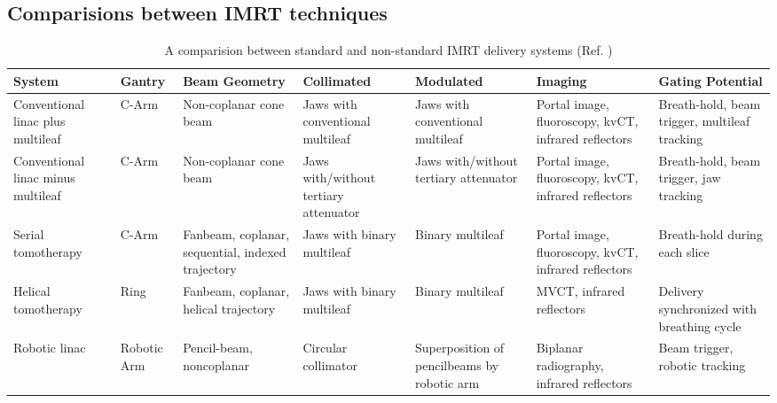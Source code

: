 \documentclass[10pt,journal,compsoc]{IEEEtran} %
\begin{document}
  \subsection{Comparisions between IMRT techniques}
  \label{comparisions}
    \begin{table}[htbp!]
      \centering
      \caption{A comparision between standard and non-standard IMRT delivery 
      systems (Ref. \cite{Fenwick2006})}
      \small{
      \begin{tabulary}{\linewidth}{LLLLLLL}
        \toprule[0.04cm]
        
        \textbf{System} & \textbf{Gantry} & \textbf{ Beam Geometry} & 
        \textbf{Collimated} & \textbf{Modulated} & \textbf{Imaging} & 
        \textbf{Gating
          Potential} \\\toprule[0.04cm]
        
        Conventional linac plus multileaf & C-Arm & Non-coplanar cone beam & 
        Jaws 
        with conventional
        multileaf & Jaws with conventional
        multileaf & Portal image, fluoroscopy, kvCT, 
        infrared 
        reflectors &
        Breath-hold, 
        beam trigger, multileaf tracking \bigstrut\\\midrule
        Conventional linac minus multileaf & C-Arm & Non-coplanar cone beam & 
        Jaws with/without tertiary attenuator
        & Jaws with/without tertiary attenuator
        & Portal image, fluoroscopy, kvCT, infrared 
        reflectors & Breath-hold,
        beam trigger,
        jaw tracking \bigstrut\\\midrule
        Serial tomotherapy & C-Arm & Fanbeam, coplanar, sequential,
        indexed trajectory & Jaws with binary
        multileaf & Binary multileaf & Portal image, 
        fluoroscopy, kvCT, infrared reflectors & Breath-hold
        during each
        slice \bigstrut\\\midrule
        Helical tomotherapy & Ring  &  Fanbeam,
        coplanar, helical
        trajectory & Jaws with binary
        multileaf & Binary multileaf & MVCT, infrared 
        reflectors & Delivery
        synchronized
        with breathing
        cycle \bigstrut \\\midrule
        Robotic linac & Robotic Arm &  Pencil-beam,
        noncoplanar & Circular collimator & Superposition of pencilbeams by 
        robotic arm & Biplanar radiography, infrared 
        reflectors & Beam 
        trigger,
        robotic
        tracking \bigstrut \\
        \bottomrule
      \end{tabulary}}%
    
      \label{tab:compare}%
    \end{table}%
\end{document}
